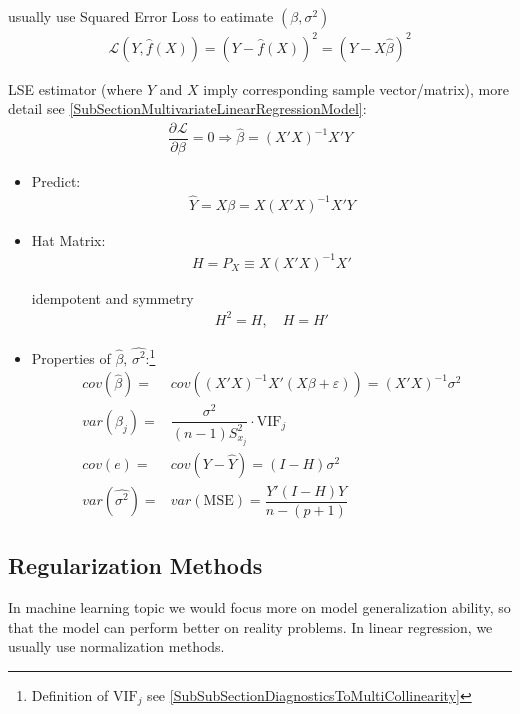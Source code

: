     usually use Squared Error Loss to eatimate $ (\beta ,\sigma ^2) $
    \begin{align}
        \mathcal{L}(Y,\hat{f}(X))=\left(Y-\hat{f}(X)\right)^2=\left(Y-X\hat{\beta } \right)^2 
    \end{align}

    LSE estimator (where $ Y $ and $ X $ imply corresponding sample vector/matrix), more detail see \autoref{SubSectionMultivariateLinearRegressionModel}:
    \begin{align}
        \dfrac{\partial^{} \mathcal{L}}{\partial \beta ^{}}=0\Rightarrow \hat{\beta }=(X'X)^{-1}X'Y 
    \end{align}
    
    \begin{itemize}[topsep=2pt,itemsep=0pt]
        \item Predict:
        \begin{align}
            \hat{Y}=X\beta =X(X'X)^{-1}X'Y 
        \end{align}
        \item Hat Matrix:
        \begin{align}
            H=P_X\equiv  X(X'X)^{-1}X'
        \end{align}

        idempotent and symmetry
        \begin{align}
            H^2=H,\quad H=H' 
        \end{align}
        \item Properties of $ \hat{\beta },\,\hat{\sigma ^2} $:\footnote{Definition of $ \mathrm{VIF}_j  $ see \autoref{SubSubSectionDiagnosticsToMultiCollinearity}}
        \begin{align}
            cov(\hat{\beta })=&cov\left((X'X)^{-1}X'(X\beta +\varepsilon )\right)=(X'X)^{-1}\sigma ^2\\
            var(\hat{\beta }_j)=&\dfrac{\sigma ^2}{(n-1)S^2_{x_j}}\cdot \mathrm{VIF}_j \\
            cov(e)=&cov(Y-\hat{Y})=(I-H)\sigma ^2\\
            var(\hat{\sigma ^2})=&var(\mathrm{MSE})=\dfrac{Y'(I-H)Y}{n-(p+1)}
        \end{align}
    \end{itemize}
    
    
\subsection{Regularization Methods}
    In machine learning topic we would focus more on model generalization ability, so that the model can perform better on reality problems. In linear regression, we usually use normalization methods.


